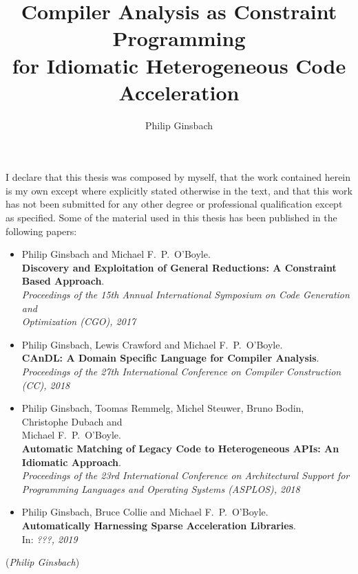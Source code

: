 \documentclass[phd,icsa,twoside,logo,11pt]{infthesis}
\title{Compiler Analysis as Constraint Programming\\
       for Idiomatic Heterogeneous Code Acceleration}
\author{Philip Ginsbach}
\begin{document}
\begin{preliminary}
\maketitle
\begin{acknowledgements}

\end{acknowledgements}
\begin{declaration}
    I declare that this thesis was composed by myself, that the work contained
    herein is my own except where explicitly stated otherwise in the text, and
    that this work has not been submitted for any other degree or professional
    qualification except as specified.
    Some of the material used in this thesis has been published in the following
    papers:

    \begin{itemize}
    \small
        \item Philip Ginsbach and Michael F.\ P.\ O'Boyle.\\
              {\bf Discovery and Exploitation of General Reductions: A
              Constraint Based Approach}.\\
              {\em Proceedings of the 15th Annual International
               Symposium on Code Generation and\\Optimization (CGO), 2017}
        \item Philip Ginsbach, Lewis Crawford and Michael F.\ P.\ O'Boyle.\\
              {\bf CAnDL: A Domain Specific Language for Compiler Analysis}.\\
              {\em Proceedings of the 27th International Conference on
               Compiler Construction (CC), 2018}
        \item Philip Ginsbach, Toomas Remmelg, Michel Steuwer, Bruno Bodin,
              Christophe Dubach and\\Michael F.\ P.\ O'Boyle.\\
              {\bf Automatic Matching of Legacy Code to Heterogeneous APIs: An
              Idiomatic Approach}.\\
              {\em Proceedings of the 23rd International Conference on
               Architectural Support for\\Programming Languages and Operating
               Systems (ASPLOS), 2018}
        \item Philip Ginsbach, Bruce Collie and Michael F.\ P.\ O'Boyle.\\
              {\bf Automatically Harnessing Sparse Acceleration Libraries}.\\
              In: {\em ???, 2019}
    \end{itemize}

    \par
\vspace{1in}\raggedleft({\em Philip Ginsbach})
\end{declaration}
\tableofcontents
\end{preliminary}
\end{document}
